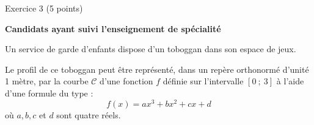 
%
\begin{h2}Exercice 3 (5 points)\end{h2}
\par
\textbf{Candidats ayant suivi l'enseignement de spécialité}
\par
%
%
\par
Un service de garde d'enfants dispose d'un toboggan dans son espace de jeux.
\par
Le profil de ce toboggan peut être représenté, dans un repère orthonormé d'unité 1 mètre, par la courbe $\mathscr{C}$ d'une fonction $f$ définie sur l'intervalle $[0~;~3]$ à l'aide d'une formule du type :
\[ f(x)=ax^3+bx^2+cx+d \]
où $a, b, c$ et $d$ sont quatre réels.
\par

